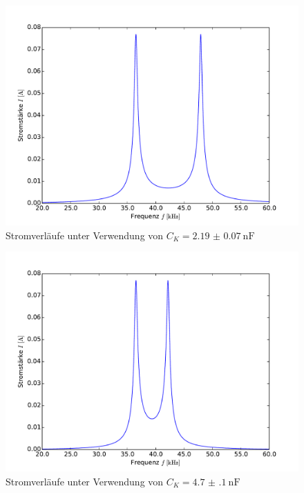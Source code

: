 	\begin{figure}[!h]
		\centering
    	\includegraphics[scale=0.7]{Grafiken/Stromverlauf1.pdf}
		\caption{Stromverläufe unter Verwendung von $C_{K} = \SI{2.19(7)}{\nano\farad}$}
		\label{fig:C1} 
	\end{figure}
		
	\begin{figure}[!h]
		\centering
    	\includegraphics[scale=0.7]{Grafiken/Stromverlauf3.pdf}
		\caption{Stromverläufe unter Verwendung von $C_{K} = \SI{4.7(1)}{\nano\farad}$}
		\label{fig:C3} 
	\end{figure}
	
